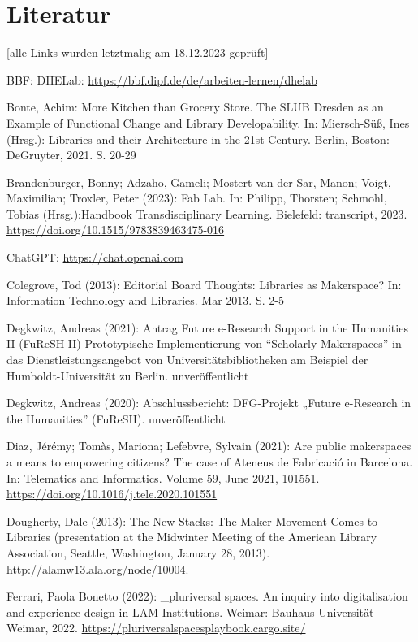 \documentclass[a4paper,
fontsize=11pt,
oneside,
numbers=noperiodatend,
parskip=half-,
bibliography=totoc,
final
]{scrartcl}
\begin{document}
\hypertarget{literatur}{%
\section{Literatur}\label{literatur}}

{[}alle Links wurden letztmalig am 18.12.2023 geprüft{]}

BBF: DHELab: \url{https://bbf.dipf.de/de/arbeiten-lernen/dhelab}

Bonte, Achim: More Kitchen than Grocery Store. The SLUB Dresden as an
Example of Functional Change and Library Developability. In:
Miersch-Süß, Ines (Hrsg.): Libraries and their Architecture in the 21st
Century. Berlin, Boston: DeGruyter, 2021. S. 20-29

Brandenburger, Bonny; Adzaho, Gameli; Mostert-van der Sar, Manon; Voigt,
Maximilian; Troxler, Peter (2023): Fab Lab. In: Philipp, Thorsten;
Schmohl, Tobias (Hrsg.):Handbook Transdisciplinary Learning. Bielefeld:
transcript, 2023. \url{https://doi.org/10.1515/9783839463475-016}

ChatGPT: \url{https://chat.openai.com}

Colegrove, Tod (2013): Editorial Board Thoughts: Libraries as
Makerspace? In: Information Technology and Libraries. Mar 2013. S. 2-5

Degkwitz, Andreas (2021): Antrag Future e-Research Support in the
Humanities II (FuReSH II) Prototypische Implementierung von
\enquote{Scholarly Makerspaces} in das Dienstleistungsangebot von
Universitätsbibliotheken am Beispiel der Humboldt-Universität zu Berlin.
unveröffentlicht

Degkwitz, Andreas (2020): Abschlussbericht: DFG-Projekt „Future
e-Research in the Humanities'' (FuReSH). unveröffentlicht

Diaz, Jérémy; Tomàs, Mariona; Lefebvre, Sylvain (2021): Are public
makerspaces a means to empowering citizens? The case of Ateneus de
Fabricació in Barcelona. In: Telematics and Informatics. Volume 59, June
2021, 101551. \url{https://doi.org/10.1016/j.tele.2020.101551}

Dougherty, Dale (2013): The New Stacks: The Maker Movement Comes to
Libraries (presentation at the Midwinter Meeting of the American Library
Association, Seattle, Washington, January 28, 2013).
\url{http://alamw13.ala.org/node/10004}.

Ferrari, Paola Bonetto (2022): \_pluriversal spaces. An inquiry into
digitalisation and experience design in LAM Institutions. Weimar:
Bauhaus-Universität Weimar, 2022.
\url{https://pluriversalspacesplaybook.cargo.site/}
\end{document}
